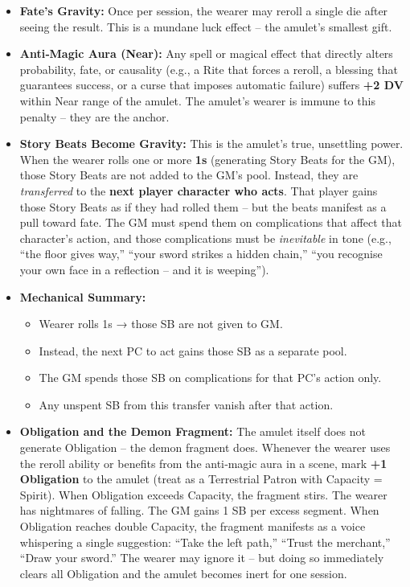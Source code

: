 \documentclass[11pt]{book}
\begin{document}
\begin{itemize}
    \item \textbf{Fate’s Gravity:} Once per session, the wearer may reroll a single die after seeing the result. This is a mundane luck effect – the amulet’s smallest gift.
    \item \textbf{Anti‑Magic Aura (Near):} Any spell or magical effect that directly alters probability, fate, or causality (e.g., a Rite that forces a reroll, a blessing that guarantees success, or a curse that imposes automatic failure) suffers \textbf{+2 DV} within Near range of the amulet. The amulet’s wearer is immune to this penalty – they are the anchor.
    \item \textbf{Story Beats Become Gravity:} This is the amulet’s true, unsettling power. When the wearer rolls one or more \textbf{1s} (generating Story Beats for the GM), those Story Beats are not added to the GM’s pool. Instead, they are \textit{transferred} to the \textbf{next player character who acts}. That player gains those Story Beats as if they had rolled them – but the beats manifest as a pull toward fate. The GM must spend them on complications that affect that character’s action, and those complications must be \textit{inevitable} in tone (e.g., “the floor gives way,” “your sword strikes a hidden chain,” “you recognise your own face in a reflection – and it is weeping”).
    \item \textbf{Mechanical Summary:}
    \begin{itemize}
        \item Wearer rolls 1s → those SB are not given to GM.
        \item Instead, the next PC to act gains those SB as a separate pool.
        \item The GM spends those SB on complications for that PC’s action only.
        \item Any unspent SB from this transfer vanish after that action.
    \end{itemize}
    \item \textbf{Obligation and the Demon Fragment:} The amulet itself does not generate Obligation – the demon fragment does. Whenever the wearer uses the reroll ability or benefits from the anti‑magic aura in a scene, mark \textbf{+1 Obligation} to the amulet (treat as a Terrestrial Patron with Capacity = Spirit). When Obligation exceeds Capacity, the fragment stirs. The wearer has nightmares of falling. The GM gains 1 SB per excess segment. When Obligation reaches double Capacity, the fragment manifests as a voice whispering a single suggestion: “Take the left path,” “Trust the merchant,” “Draw your sword.” The wearer may ignore it – but doing so immediately clears all Obligation and the amulet becomes inert for one session.
\end{itemize}
\end{document}
